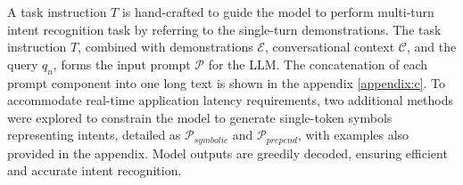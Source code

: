 A task instruction $T$ is hand-crafted to guide the model to perform multi-turn intent recognition task by referring to the single-turn demonstrations. The task instruction $T$, combined with demonstrations $\mathcal{E}$, conversational context $\mathcal{C}$, and the query $q_n$, forms the input prompt $\mathcal{P}$ for the LLM. The concatenation of each prompt component into one long text is shown in the appendix \ref{appendix:c}. To accommodate real-time application latency requirements, two additional methods were explored to constrain the model to generate single-token symbols representing intents, detailed as $\mathcal{P}_{symbolic}$ and $\mathcal{P}_{prepend}$, with examples also provided in the appendix. Model outputs are greedily decoded, ensuring efficient and accurate intent recognition.

